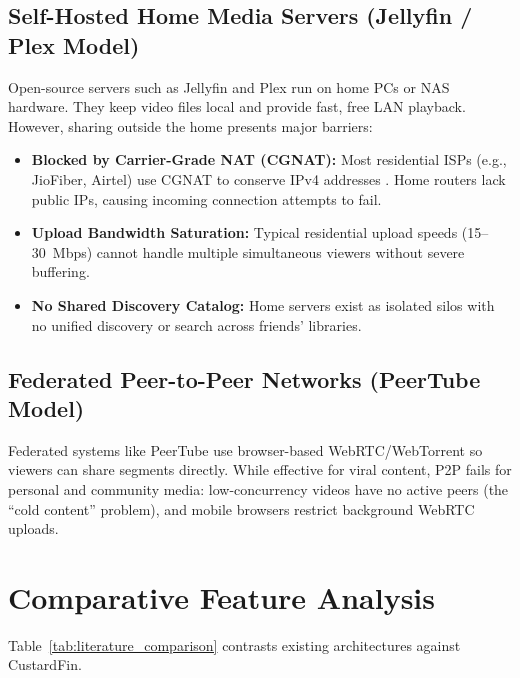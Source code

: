 \subsection{Self-Hosted Home Media Servers (Jellyfin / Plex Model)}
Open-source servers such as Jellyfin \cite{jellyfin2024project} and Plex run on home PCs or NAS hardware. They keep video files local and provide fast, free LAN playback. However, sharing outside the home presents major barriers:
\begin{itemize}
    \item \textbf{Blocked by Carrier-Grade NAT (CGNAT):} Most residential ISPs (e.g., JioFiber, Airtel) use CGNAT to conserve IPv4 addresses \cite{weil2012cgnat}. Home routers lack public IPs, causing incoming connection attempts to fail.
    \item \textbf{Upload Bandwidth Saturation:} Typical residential upload speeds (15--30~Mbps) cannot handle multiple simultaneous viewers without severe buffering.
    \item \textbf{No Shared Discovery Catalog:} Home servers exist as isolated silos with no unified discovery or search across friends' libraries.
\end{itemize}

\subsection{Federated Peer-to-Peer Networks (PeerTube Model)}
Federated systems like PeerTube \cite{lemmet2021peertube} use browser-based WebRTC/WebTorrent so viewers can share segments directly. While effective for viral content, P2P fails for personal and community media: low-concurrency videos have no active peers (the ``cold content'' problem), and mobile browsers restrict background WebRTC uploads.

\section{Comparative Feature Analysis}
\label{sec:survey_comparison}

Table~\ref{tab:literature_comparison} contrasts existing architectures against CustardFin.

